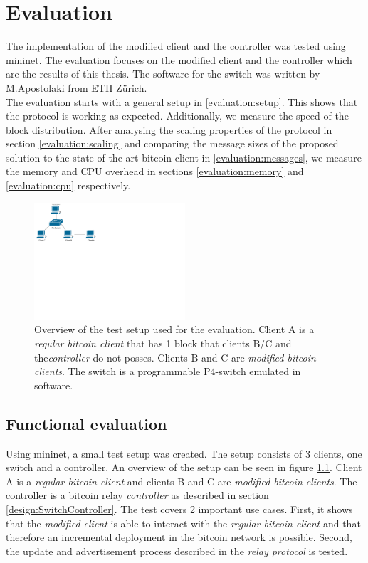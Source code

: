 \chapter{Evaluation \label{evaluation}}
The implementation of the modified client and the controller was tested using mininet. The evaluation focuses on the modified client and the controller which are the results of this thesis. The software for the switch was written by M.Apostolaki from ETH Zürich.\\
The evaluation starts with a general setup in \ref{evaluation:setup}. This shows that the protocol is working as expected. Additionally, we measure the speed of the block distribution. After analysing the scaling properties of the protocol in section \ref{evaluation:scaling} and comparing the message sizes of the proposed solution to the state-of-the-art bitcoin client in \ref{evaluation:messages}, we measure the memory and CPU overhead in sections \ref{evaluation:memory} and \ref{evaluation:cpu} respectively.

\begin{figure}[!hbt]
  \begin{center}
	\includegraphics[width=0.5\textwidth]{Figures/Test_setup.pdf}
	  \end{center}

  \caption[Overview of the test setup used for the evaluation.]{Overview of the test setup used for the evaluation. Client A is a \textit{regular bitcoin client} that has 1 block that clients B/C and the\textit{controller} do not posses. Clients B and C are \textit{modified bitcoin clients}. The switch is a programmable P4-switch emulated in software.}
  \label{figure:test_setup}
\end{figure}

\section{\label{evaluation:setup}Functional evaluation}
Using mininet, a small test setup was created. The setup consists of 3 clients, one switch and a controller. An overview of the setup can be seen in figure \ref{figure:test_setup}. Client A is a \textit{regular bitcoin client} and clients B and C are \textit{modified bitcoin clients}. The controller is a bitcoin relay \textit{controller} as described in section \ref{design:SwitchController}. The test covers 2 important use cases. First, it shows that the \textit{modified client} is able to interact with the \textit{regular bitcoin client} and that therefore an incremental deployment in the bitcoin network is possible. Second, the update and advertisement process described in the \textit{relay protocol} is tested. 

